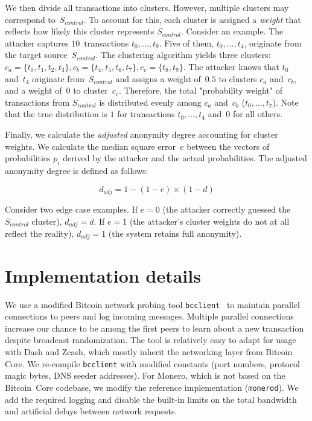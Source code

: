 We then divide all transactions into clusters.
However, multiple clusters may correspond to~$S_{control}$.
To account for this, each cluster is assigned a \textit{weight} that reflects how likely this cluster represents $S_{control}$.
Consider an example.
The attacker captures $10$~transactions $t_0, \dots, t_9$.
Five of them, $t_0, \dots, t_4$, originate from the target source~$S_{control}$.
The clustering algorithm yields three clusters: $c_a = \{t_0, t_1, t_2, t_3\}, c_b = \{t_4, t_5, t_6, t_7\}, c_c = \{t_8, t_9\}$.
The attacker knows that $t_0$ and~$t_4$ originate from~$S_{control}$ and assigns a weight of~$0.5$ to clusters $c_a$ and~$c_b$, and a weight of~$0$ to cluster~$c_c$.
Therefore, the total "probability weight" of transactions from $S_{control}$ is distributed evenly among $c_a$ and~$c_b$ ($t_0, \dots, t_7$).
Note that the true distribution is $1$ for transactions $t_0, \dots, t_4$ and~$0$ for all others.

Finally, we calculate the \textit{adjusted} anonymity degree accounting for cluster weights.
We calculate the median square error~$e$ between the vectors of probabilities $p_i$ derived by the attacker and the actual probabilities.
The adjusted anonymity degree is defined as follows:

\[
d_{adj} = 1 - (1 - e) \times (1 - d)
\]

Consider two edge case examples.
If $e = 0$ (the attacker correctly guessed the~$S_{control}$ cluster), $d_{adj} = d$.
If $e = 1$ (the attacker's cluster weights do not at all reflect the reality), $d_{adj} = 1$ (the system retains full anonymity).


\section{Implementation details}

We use a modified Bitcoin network probing tool \texttt{bcclient}~\cite{Pustogarov2017} to maintain parallel connections to peers and log incoming messages.
Multiple parallel connections increase our chance to be among the first peers to learn about a new transaction despite broadcast randomization.
The tool is relatively easy to adapt for usage with Dash and Zcash, which mostly inherit the networking layer from Bitcoin Core.
We re-compile \texttt{bcclient} with modified constants (port numbers, protocol magic bytes, DNS seeder addresses).
For Monero, which is not based on the Bitcoin~Core codebase, we modify the reference implementation (\texttt{monerod}).
We add the required logging and disable the built-in limits on the total bandwidth and artificial delays between network requests.

